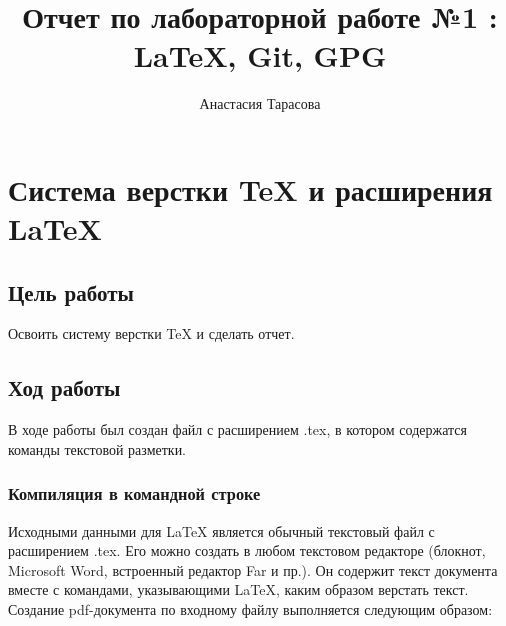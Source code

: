 \documentclass[12pt,a4paper]{article}
\author{Анастасия Тарасова}
\title{Отчет по лабораторной работе №1 :\\ \LaTeX{}, Git, GPG}
\begin{document}
\maketitle
\section{Система верстки \TeX{} и расширения \LaTeX{}}
\subsection{Цель работы}
Освоить систему верстки \TeX{} и сделать отчет.
\subsection{Ход работы}
В ходе работы был создан файл с расширением .tex, в котором содержатся команды текстовой разметки.
\subsubsection{Компиляция в командной строке}
Исходными данными для \LaTeX{} является обычный текстовый файл с расширением .tex. Его можно создать в любом текстовом редакторе (блокнот, Microsoft Word, встроенный редактор Far и пр.). Он содержит текст документа вместе с командами, указывающими \LaTeX{}, каким образом верстать текст.
Создание pdf-документа по входному файлу выполняется следующим образом:
\end{document}

